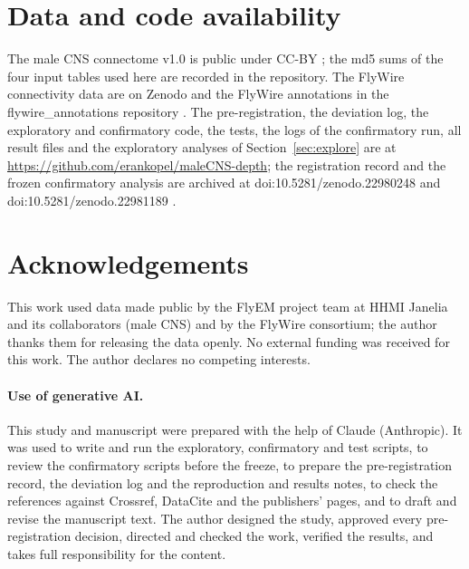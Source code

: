 \section*{Data and code availability}

The male CNS connectome v1.0 is public under CC-BY \cite{berg2026,malecnsdata}; the md5 sums of the
four input tables used here are recorded in the repository. The FlyWire connectivity data are on
Zenodo \cite{flywire783} and the FlyWire annotations in the flywire\_annotations repository
\cite{schlegel2024}. The pre-registration, the deviation log, the exploratory and confirmatory code,
the tests, the logs of the confirmatory run, all result files and the exploratory analyses of
Section~\ref{sec:explore} are at \url{https://github.com/erankopel/maleCNS-depth}; the registration
record and the frozen confirmatory analysis are archived at doi:10.5281/zenodo.22980248
\cite{kopel2026reg} and doi:10.5281/zenodo.22981189 \cite{kopel2026freeze}.

\section*{Acknowledgements}

This work used data made public by the FlyEM project team at HHMI Janelia and its collaborators
(male CNS) and by the FlyWire consortium; the author thanks them for releasing the data openly.
No external funding was received for this work. The author declares no competing interests.

\paragraph{Use of generative AI.}
This study and manuscript were prepared with the help of Claude (Anthropic).
It was used to write and run the exploratory, confirmatory and test scripts, to review the
confirmatory scripts before the freeze, to prepare the pre-registration record, the deviation log
and the reproduction and results notes, to check the references against Crossref, DataCite and the
publishers' pages, and to draft and revise the manuscript text. The author designed the study,
approved every pre-registration decision, directed and checked the work, verified the results, and
takes full responsibility for the content.
